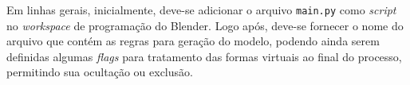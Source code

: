 \begin{figure}[h!]
	\centering
	\captionsetup{width=15cm}
	{}	
\end{figure}

Em linhas gerais, inicialmente, deve-se adicionar o arquivo \texttt{main.py} como \textit{script} no \textit{workspace} de programação do Blender. Logo após, deve-se fornecer o nome do arquivo que contém as regras para geração do modelo, podendo ainda serem definidas algumas \textit{flags} para tratamento das formas virtuais ao final do processo, permitindo sua ocultação ou exclusão.

